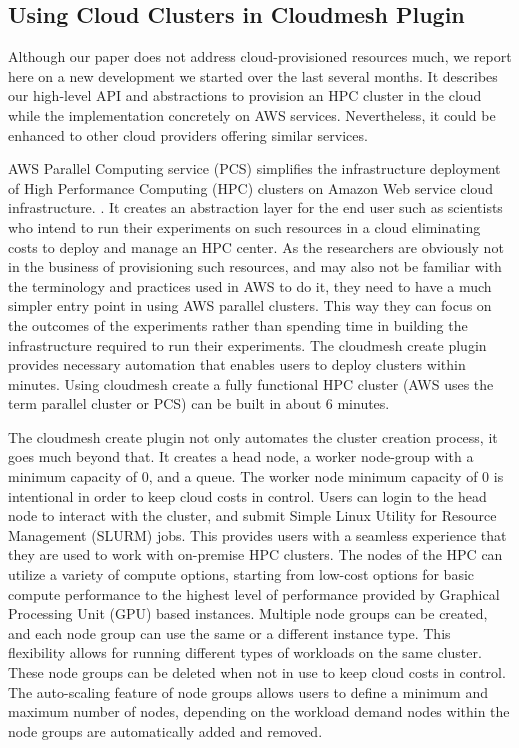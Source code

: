 \documentclass[utf8]{FrontiersinVancouver} %
\begin{document}
\subsection{Using Cloud Clusters in Cloudmesh Plugin}
\label{sec:cloudcluster}

Although our paper does not address cloud-provisioned resources much, we report here on a new development we started over the last several months. It describes our high-level API and abstractions to provision an HPC cluster in the cloud while the implementation concretely on AWS services. Nevertheless, it could be enhanced to other cloud providers offering similar services.

AWS Parallel Computing service (PCS) simplifies the infrastructure deployment of High Performance Computing (HPC) clusters on Amazon Web service cloud infrastructure. \citep{awspcs}. It creates an abstraction layer for the end user such as scientists who intend to run their experiments on such resources in a cloud eliminating costs to deploy and manage an HPC center. As the researchers are obviously not in the business of provisioning such resources, and may also not be familiar with the terminology and practices used in AWS to do it, they need to have a much simpler entry point in using AWS parallel clusters.
This way they can focus on the outcomes of the experiments rather than spending time in building the infrastructure required to run their experiments. The cloudmesh create plugin provides necessary automation that enables users to deploy clusters within minutes. Using cloudmesh create a fully functional HPC cluster  (AWS uses the term parallel cluster or PCS) can be built in about 6 minutes. 

The cloudmesh create plugin not only automates the cluster creation process, it goes much beyond that. It creates a head node, a worker node-group with a minimum capacity of 0, and a queue. The worker node minimum capacity of 0 is intentional in order to keep cloud costs in control. Users can login to the head node to interact with the cluster, and submit Simple Linux Utility for Resource Management (SLURM) jobs. This provides users with a seamless experience that they are used to work with on-premise HPC clusters. The nodes of the HPC can utilize a variety of compute options, starting from low-cost options for basic compute performance to the highest level of performance provided by Graphical Processing Unit (GPU) based instances. Multiple node groups can be created, and each node group can use the same or a different instance type. This flexibility allows for running different types of workloads on the same cluster. These node groups can be deleted when not in use to keep cloud costs in control. The auto-scaling feature of node groups allows users to define a minimum and maximum number of nodes, depending on the workload demand nodes within the node groups are automatically added and removed.
\end{document}
